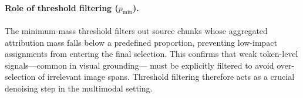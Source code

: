 \paragraph{Role of threshold filtering ($p_{\min}$).}
The minimum-mass threshold filters out source chunks whose aggregated attribution mass falls below a predefined proportion,
preventing low-impact assignments from entering the final selection.
This confirms that weak token-level signals—common in visual grounding—
must be explicitly filtered to avoid over-selection of irrelevant image spans.
Threshold filtering therefore acts as a crucial denoising step in the multimodal setting.

